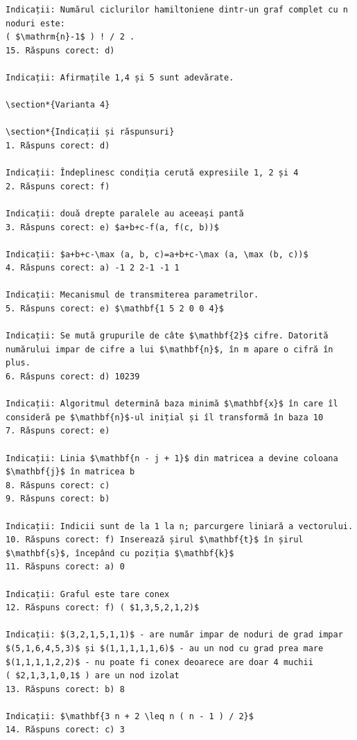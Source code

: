 \documentclass[10pt]{article}
\begin{document}
\begin{verbatim}
Indicații: Numărul ciclurilor hamiltoniene dintr-un graf complet cu n noduri este:
( $\mathrm{n}-1$ ) ! / 2 .
15. Răspuns corect: d)

Indicații: Afirmațile 1,4 și 5 sunt adevărate.

\section*{Varianta 4}

\section*{Indicații și răspunsuri}
1. Răspuns corect: d)

Indicații: Îndeplinesc condiția cerută expresiile 1, 2 și 4
2. Răspuns corect: f)

Indicații: două drepte paralele au aceeași pantă
3. Răspuns corect: e) $a+b+c-f(a, f(c, b))$

Indicații: $a+b+c-\max (a, b, c)=a+b+c-\max (a, \max (b, c))$
4. Răspuns corect: a) -1 2 2-1 -1 1

Indicații: Mecanismul de transmiterea parametrilor.
5. Răspuns corect: e) $\mathbf{1 5 2 0 0 4}$

Indicații: Se mută grupurile de câte $\mathbf{2}$ cifre. Datorită numărului impar de cifre a lui $\mathbf{n}$, în m apare o cifră în plus.
6. Răspuns corect: d) 10239

Indicații: Algoritmul determină baza minimă $\mathbf{x}$ în care îl consideră pe $\mathbf{n}$-ul inițial și îl transformă în baza 10
7. Răspuns corect: e)

Indicații: Linia $\mathbf{n - j + 1}$ din matricea a devine coloana $\mathbf{j}$ în matricea b
8. Răspuns corect: c)
9. Răspuns corect: b)

Indicații: Indicii sunt de la 1 la n; parcurgere liniară a vectorului.
10. Răspuns corect: f) Inserează șirul $\mathbf{t}$ în șirul $\mathbf{s}$, începând cu poziția $\mathbf{k}$
11. Răspuns corect: a) 0

Indicații: Graful este tare conex
12. Răspuns corect: f) ( $1,3,5,2,1,2)$

Indicații: $(3,2,1,5,1,1)$ - are număr impar de noduri de grad impar
$(5,1,6,4,5,3)$ și $(1,1,1,1,1,6)$ - au un nod cu grad prea mare
$(1,1,1,1,2,2)$ - nu poate fi conex deoarece are doar 4 muchii
( $2,1,3,1,0,1$ ) are un nod izolat
13. Răspuns corect: b) 8

Indicații: $\mathbf{3 n + 2 \leq n ( n - 1 ) / 2}$
14. Răspuns corect: c) 3


\end{verbatim}
\end{document}
